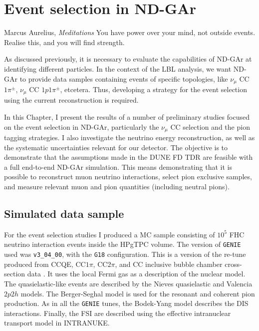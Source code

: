 \chapter{Event selection in ND-GAr}
\label{chapter:gar_selection}

\begin{chapquote}{Marcus Aurelius, \textit{Meditations}}
	You have power over your mind, not outside events. Realise this, and you will find strength.
\end{chapquote}

As discussed previously, it is necessary to evaluate the capabilities of ND-GAr at identifying different particles. In the context of the LBL analysis, we want ND-GAr to provide data samples containing events of specific topologies, like $\nu_{\mu}$ CC $1\pi^{\pm}$, $\nu_{\mu}$ CC $1p1\pi^{\pm}$, etcetera. Thus, developing a strategy for the event selection using the current reconstruction is required.

In this Chapter, I present the results of a number of preliminary studies focused on the event selection in ND-GAr, particularly the $\nu_{\mu}$ CC selection and the pion tagging strategies. I also investigate the neutrino energy reconstruction, as well as the systematic uncertainties relevant for our detector. The objective is to demonstrate that the assumptions made in the DUNE FD TDR \cite{DUNE2020TDR2} are feasible with a full end-to-end ND-GAr simulation. This means demonstrating that it is possible to reconstruct muon neutrino interactions, select pion exclusive samples, and measure relevant muon and pion quantities (including neutral pions).

\section{Simulated data sample}
\label{sec:gar_data}

For the event selection studies I produced a MC sample consisting of $10^{5}$ FHC neutrino interaction events inside the HPgTPC volume. The version of \texttt{GENIE} used was \texttt{v3_04_00}, with the \texttt{G18} configuration. This is a version of the re-tune produced from CCQE, CC$1\pi$, CC$2\pi$, and CC inclusive bubble chamber cross-section data \cite{GENIE2021}. It uses the local Fermi gas \cite{Chiang1989} as a description of the nuclear model. The quasielastic-like events are described by the Nieves quasielastic \cite{Nieves2004} and Valencia $2p2h$ \cite{Nieves2011} models. The Berger-Seghal model \cite{Berger2007,Berger2008} is used for the resonant and coherent pion production. As in all the \texttt{GENIE} tunes, the Bodek-Yang model \cite{Bodek2002} describes the DIS interactions. Finally, the FSI are described using the effective intranuclear transport model in INTRANUKE.

